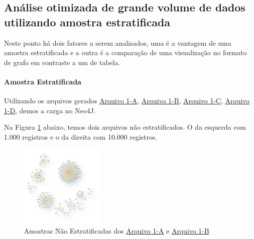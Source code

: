 \subsection{Análise otimizada de grande volume de dados utilizando amostra estratificada}
	
Neste ponto há dois fatores a serem analisados, uma é a vantagem de uma amostra estratificada e a outra é a comparação de uma visualização no formato de grafo em contraste a um de tabela. 
	
\paragraph{Amostra Estratificada} Utilizando os arquivos gerados \hyperref[arq:1A]{Arquivo 1-A}, \hyperref[arq:1B]{Arquivo 1-B}, \hyperref[arq:1C]{Arquivo 1-C}, \hyperref[arq:1D]{Arquivo 1-D}, demos a carga no Neo4J.
	
Na Figura \ref{fig1} abaixo, temos dois arquivos não estratificados. O da esquerda com 1.000 registros e o da direita com 10.000 registros.
	
\begin{figure}[htbp]
	\centerline{
		\includegraphics[width=40mm,scale=0.4]{assets/Imagem1.jpg}
	}
	\caption{Amostras Não Estratificadas dos \hyperref[arq:1A]{Arquivo 1-A} e \hyperref[arq:1B]{Arquivo 1-B}}
	\label{fig1}
\end{figure}
